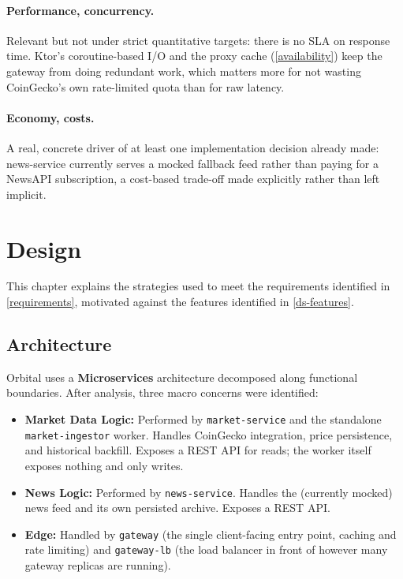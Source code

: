 \documentclass{scrartcl}
\begin{document}
\paragraph{Performance, concurrency.} Relevant but not under strict quantitative targets: there
is no SLA on response time. Ktor's coroutine-based I/O and the proxy cache (\cref{availability})
keep the gateway from doing redundant work, which matters more for not wasting CoinGecko's own
rate-limited quota than for raw latency.

\paragraph{Economy, costs.} A real, concrete driver of at least one implementation decision
already made: news-service currently serves a mocked fallback feed rather than paying for a
NewsAPI subscription, a cost-based trade-off made explicitly rather than left implicit.

\section{Design}\label{design}

This chapter explains the strategies used to meet the requirements identified in
\cref{requirements}, motivated against the features identified in \cref{ds-features}.

\subsection{Architecture}\label{architecture}

Orbital uses a \textbf{Microservices} architecture decomposed along functional boundaries. After
analysis, three macro concerns were identified:

\begin{itemize}
  \item \textbf{Market Data Logic:} Performed by \texttt{market-service} and the standalone
  \texttt{market-ingestor} worker. Handles CoinGecko integration, price persistence, and
  historical backfill. Exposes a REST API for reads; the worker itself exposes nothing and only
  writes.
  \item \textbf{News Logic:} Performed by \texttt{news-service}. Handles the (currently mocked)
  news feed and its own persisted archive. Exposes a REST API.
  \item \textbf{Edge:} Handled by \texttt{gateway} (the single client-facing entry point, caching
  and rate limiting) and \texttt{gateway-lb} (the load balancer in front of however many gateway
  replicas are running).
\end{itemize}
\end{document}
